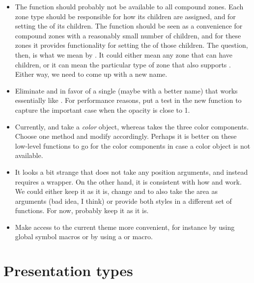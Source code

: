 \begin{itemize}
\item The function  should probably not be
  available to all compound zones. Each zone type should be
  responsible for how its children are assigned, and for setting the
   of its children.  The function  should be seen as a convenience for compound
  zones with a reasonably small number of children, and for these
  zones it provides functionality for setting the  of
  those children.  The question, then, is what we mean by
  .  It could either mean any zone that can have
  children, or it can mean the particular type of zone that also
  supports .  Either way, we need to come
  up with a new name. 

\item Eliminate  and  in
  favor of a single  (maybe with a better name)
  that works essentially like .  For
  performance reasons, put a test in the new function to capture the
  important case when the opacity is close to 1. 

\item Currently,  and  take
  a \emph{color} object, whereas  takes the three
  color components.  Choose one method and modify accordingly.
  Perhaps it is better on these low-level functions to go for the
  color components in case a color object is not available. 

\item It looks a bit strange that  does not take any
  position arguments, and instead requires a 
  wrapper.  On the other hand, it is consistent with how
   and  work.  We could
  either keep it as it is, change  and
   to also take the area as arguments (bad
  idea, I think) or provide both styles in a different set of
  functions.   For now, probably keep it as it is.

\item Make access to the current theme more convenient, for instance
  by using global symbol macros or by using a  or
   macro.

\end{itemize}

\section{Presentation types}


